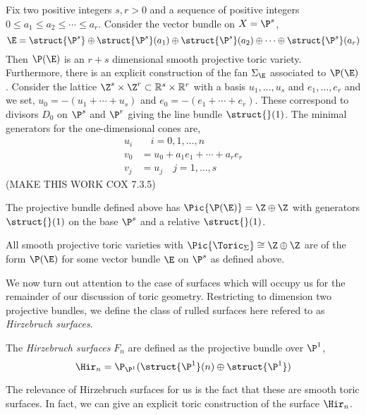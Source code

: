 \documentclass[12pt]{article}
\begin{document}
\begin{prop}[Cox 7.3.5]
Fix two positive integers $s, r > 0$ and a sequence of positive integers $0 \le a_1 \le a_2 \le \cdots \le a_r$. Consider the vector bundle on $X = \P^s$,
\begin{equation}
\E = \struct{\P^s} \oplus \struct{\P^s}(a_1) \oplus \struct{\P^s}(a_2) \oplus \cdots \oplus \struct{\P^s}(a_r) 
\end{equation}
Then $\P(\E)$ is an $r + s$ dimensional smooth projective toric variety. Furthermore, there is an explicit construction of the fan $\Sigma_\E$ associated to $\P(\E)$. Consider the lattice $\Z^s \times \Z^r \subset \mathbb{R}^s \times \mathbb{R}^r$ with a basis $u_1, \dots, u_s$ and $e_1, \dots, e_r$ and we set, $u_0 = -(u_1 + \cdots + u_s)$ and $e_0 = -(e_1 + \cdots + e_r)$. These correspond to divisors $D_0$ on $\P^s$ and $\P^r$ giving the line bundle $\struct{}(1)$. The minimal generators for the one-dimensional cones are,
\begin{align}
u_i & \quad i = 0, 1, \dots, n
\\
v_0 & = u_0 + a_1 e_1 + \cdots + a_r e_r
\\
v_j & = u_j \quad j = 1, \dots, s
\end{align} 
(MAKE THIS WORK COX 7.3.5)
\end{prop}

\begin{prop}
The projective bundle defined above has $\Pic{\P(\E)} = \Z \oplus \Z$ with generators $\struct{}(1)$ on the base $\P^s$ and a relative $\struct{}(1)$. 
\end{prop}

\begin{theorem}[Kleinschmidt]
All smooth projective toric varieties with $\Pic{\Toric_\Sigma} \cong \Z \oplus \Z$ are of the form $\P(\E)$ for some vector bundle $\E$ on $\P^s$ as defined above. 
\end{theorem}

We now turn out attention to the case of surfaces which will occupy us for the remainder of our discussion of toric geometry. Restricting to dimension two projective bundles, we define the class of rulled surfaces here refered to as \textit{Hirzebruch surfaces}.

\begin{defn}
The \textit{Hirzebruch surfaces} $F_n$ are defined as the projective bundle over $\P^1$,
\[ \Hir_n = \P_{\P^1}(\struct{\P^1}(n) \oplus \struct{\P^1}) \]
\end{defn}

The relevance of Hirzebruch surfaces for us is the fact that these are smooth toric surfaces. In fact, we can give an explicit toric construction of the surface $\Hir_n$.
\end{document}
